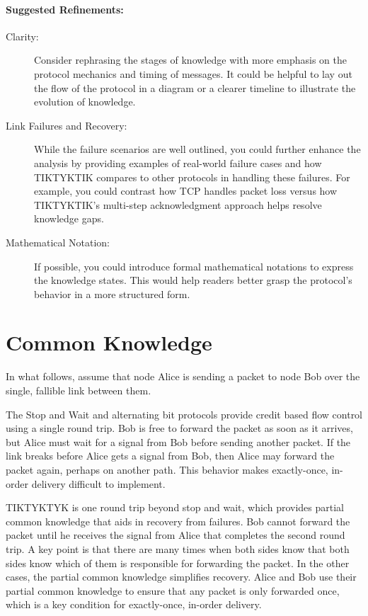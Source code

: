 \documentclass[../../../OAE-SPEC-MAIN.tex]{subfiles}
\begin{document}
\paragraph{Suggested Refinements:}

\begin{description}
	\item [Clarity:] Consider rephrasing the stages of knowledge with more emphasis on the protocol mechanics and timing of messages. It could be helpful to lay out the flow of the protocol in a diagram or a clearer timeline to illustrate the evolution of knowledge.
	\item [Link Failures and Recovery:] While the failure scenarios are well outlined, you could further enhance the analysis by providing examples of real-world failure cases and how TIKTYKTIK compares to other protocols in handling these failures. For example, you could contrast how TCP handles packet loss versus how TIKTYKTIK’s multi-step acknowledgment approach helps resolve knowledge gaps.
	\item [Mathematical Notation:]If possible, you could introduce formal mathematical notations to express the knowledge states. This would help readers better grasp the protocol’s behavior in a more structured form.
\end{description}



\section{Common Knowledge}

In what follows, assume that node Alice is sending a packet to node Bob over the single, fallible link between them.

The Stop and Wait and alternating bit protocols provide credit based flow control using a single round trip.  Bob is free to forward the packet as soon as it arrives, but Alice must wait for a signal from Bob before sending another packet.  If the link breaks before Alice gets a signal from Bob, then Alice may forward the packet again, perhaps on another path.  This behavior makes exactly-once, in-order delivery difficult to implement.

TIKTYKTYK is one round trip beyond stop and wait, which provides partial common knowledge that aids in recovery from failures.  Bob cannot forward the packet until he receives the signal from Alice that completes the second round trip.  A key point is that there are many times when both sides know that both sides know which of them is responsible for forwarding the packet.  In the other cases, the partial common knowledge simplifies recovery.  Alice and Bob use their partial common knowledge to ensure that any packet is only forwarded once, which is a key condition for exactly-once, in-order delivery.
\end{document}
